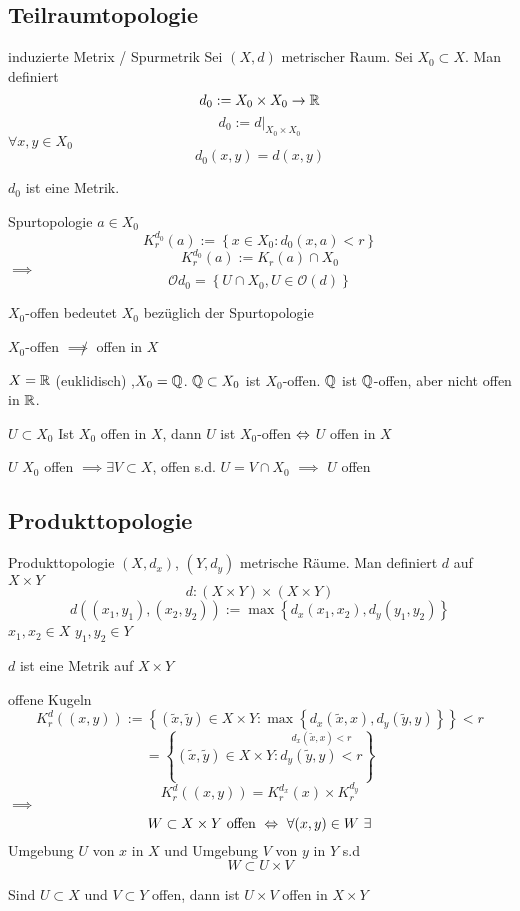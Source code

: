 \subsection{Teilraumtopologie}
\begin{Def}{induzierte Metrix / Spurmetrik}
  Sei $(X,d)$ metrischer Raum. Sei $X_0\subset X$. Man definiert
  \[d_0:=X_0\times X_0\to\mathbb{R}\]
  \[d_0:=d|_{X_0\times X_0}\]
  $\forall x,y\in X_0$
  \[d_0(x,y)=d(x,y)\]
\end{Def}
\begin{Lem}
  $d_0$ ist eine Metrik.
\end{Lem}
\begin{Def}{Spurtopologie}
  $a\in X_0$
  \[K_r^{d_0}(a):=\left\{ x\in X_0:d_0(x,a)<r \right\}\]
  \[K_r^{d_0}(a):=K_r(a)\cap X_0\]
  $\implies$
  \[\mathcal{O}d_0=\left\{ U\cap X_0,U\in \mathcal{O}(d) \right\}\]
\end{Def}
\begin{Not}
  $X_0$-offen bedeutet $X_0$ bezüglich der Spurtopologie
\end{Not}
\begin{Bem}
  $X_0$-offen $\not\implies$ offen in $X$
\end{Bem}
\begin{Bsp}
  $X=\mathbb{R}$ (euklidisch) ,$X_0=\mathbb{Q}$. $\mathbb{Q}\subset X_0$ ist $X_0$-offen. $\mathbb{Q}$ ist $\mathbb{Q}$-offen, aber nicht offen in $\mathbb{R}$.
\end{Bsp}
\begin{Lem}
  $U\subset X_0$ Ist $X_0$ offen in $X$, dann $U$ ist $X_0$-offen $\Leftrightarrow$ $U$ offen in $X$
\end{Lem}
\begin{Bew}
  $U$ $X_0$ offen $\implies \exists V\subset X$, offen s.d. $U=V\cap X_0$ $\implies$ $U$ offen
\end{Bew}
\subsection{Produkttopologie}
\begin{Def}{Produkttopologie}
  $(X,d_x)$, $(Y,d_y)$ metrische Räume. Man definiert $d$ auf $X\times Y$
  \[d:(X\times Y)\times(X\times Y)\]
  \[d\left( (x_1,y_1),(x_2,y_2) \right):=\max\left\{ d_x(x_1,x_2),d_y(y_1,y_2) \right\}\]
  $x_1,x_2\in X$ $y_1,y_2\in Y$
\end{Def}
\begin{Lem}
  $d$ ist eine Metrik auf $X\times Y$
\end{Lem}
\begin{Bem}{offene Kugeln}
  \[K_r^d\left( (x,y) \right):=\left\{ (\tilde x,\tilde y)\in X\times Y:\max\left\{ d_x(\tilde x,x),d_y(\tilde y,y) \right\} \right\}<r\]
  \[=\left\{ (\tilde x,\tilde y)\in X\times Y: \stackrel{d_x(\tilde x,x)<r}{d_y(\tilde y,y)<r} \right\}\]
  \[K_r^d\left( (x,y) \right)=K_r^{d_x}(x)\times K_r^{d_y}\]
  $\implies$
  \[W\subset X\times Y\ \text{offen}\ \Lra\ \forall (x,y)\in W\ \exists\]
  Umgebung $U$ von $x$ in $X$ und Umgebung $V$ von $y$ in $Y$ s.d
  \[W\subset U\times V\]
\end{Bem}
\begin{Bsp}
  Sind $U\subset X$ und $V\subset Y$ offen, dann ist $U\times V$ offen in $X\times Y$
\end{Bsp}
